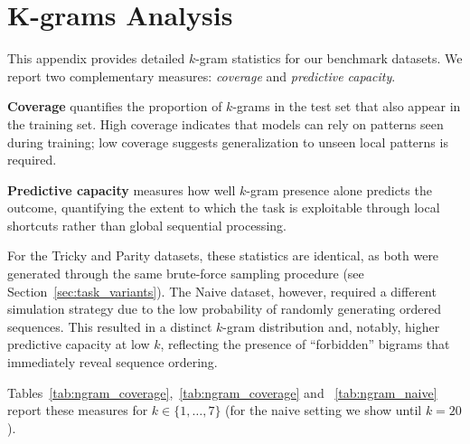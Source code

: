 \documentclass{article}
\theoremstyle{plain}
\theoremstyle{definition}
\theoremstyle{remark}
\begin{document}
\newpage
\section{K-grams Analysis}
\label{appendix:k_gram_analysis}
This appendix provides detailed $k$-gram statistics for our benchmark datasets. We report two complementary measures: \emph{coverage} and \emph{predictive capacity}.

\textbf{Coverage} quantifies the proportion of $k$-grams in the test set that also appear in the training set. High coverage indicates that models can rely on patterns seen during training; low coverage suggests generalization to unseen local patterns is required.

\textbf{Predictive capacity} measures how well $k$-gram presence alone predicts the outcome, quantifying the extent to which the task is exploitable through local shortcuts rather than global sequential processing.

For the Tricky and Parity datasets, these statistics are identical, as both were generated through the same brute-force sampling procedure (see Section~\ref{sec:task_variants}). The Naive dataset, however, required a different simulation strategy due to the low probability of randomly generating ordered sequences. This resulted in a distinct $k$-gram distribution and, notably, higher predictive capacity at low $k$, reflecting the presence of ``forbidden'' bigrams that immediately reveal sequence ordering.

Tables~\ref{tab:ngram_coverage},~\ref{tab:ngram_coverage} and ~\ref{tab:ngram_naive} report these measures for $k \in \{1, \ldots, 7\}$ (for the naive setting we show until $k=20$).
\end{document}
